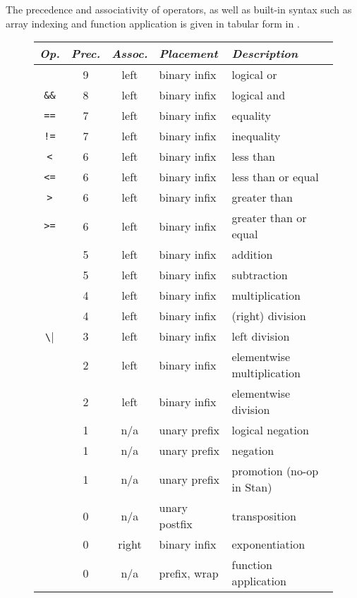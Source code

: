 The precedence and associativity of operators, as well as built-in
syntax such as array indexing and function application is given in
tabular form in .
%
\begin{figure}
\begin{center}
\begin{tabular}{c|ccl|l}
{\it Op.} & {\it Prec.} & {\it Assoc.} & {\it
  Placement} & {\it Description}
\\ \hline \hline
\code{||} & 9 & left & binary infix & logical or
\\ \hline
\Verb|&&| & 8 & left & binary infix & logical and
\\ \hline
\Verb|==| & 7 & left & binary infix & equality
\\
\Verb|!=| & 7 & left & binary infix & inequality
\\ \hline
\Verb|<| & 6 & left & binary infix & less than
\\
\Verb|<=| & 6 & left & binary infix & less than or equal
\\
\Verb|>| & 6 & left & binary infix & greater than 
\\
\Verb|>=| & 6 & left & binary infix & greater than or equal
\\ \hline
\code{+} & 5 & left & binary infix & addition
\\
\code{-} & 5 & left & binary infix & subtraction
\\ \hline
\code{*} & 4 & left & binary infix & multiplication
\\
\code{/} & 4 & left & binary infix & (right) division
\\ \hline
\Verb|\| & 3 & left & binary infix & left division
\\ \hline
\code{.*} & 2 & left & binary infix & elementwise multiplication
\\
\code{./} & 2 & left & binary infix & elementwise division
\\ \hline
\code{!} & 1 & n/a & unary prefix & logical negation
\\
\code{-} & 1 & n/a & unary prefix & negation
\\ 
\code{+} & 1 & n/a & unary prefix & promotion (no-op in Stan)
\\ \hline
\code{'} & 0 & n/a & unary postfix & transposition
\\ 
\code{\textasciicircum} & 0 & right & binary infix & exponentiation
\\ \hline \hline
\code{()} & 0 & n/a & prefix, wrap & function application
\\

\end{tabular}
\end{center}
\end{figure}
